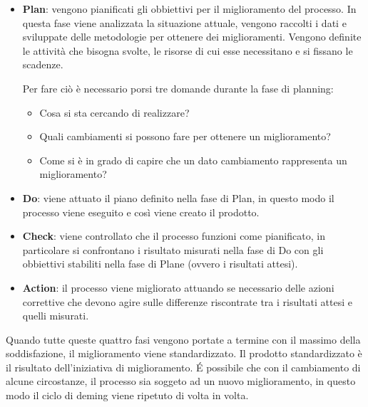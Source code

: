 \begin{itemize}
	\item \textbf{Plan}: vengono pianificati gli obbiettivi per il miglioramento del processo. In questa fase viene analizzata la situazione attuale, vengono raccolti i dati e sviluppate delle metodologie per ottenere dei miglioramenti. Vengono definite le attività che bisogna svolte, le risorse di cui esse necessitano e si fissano le scadenze.
	
	Per fare ciò è necessario porsi tre domande durante la fase di planning:
	\begin{itemize}
		\item Cosa si sta cercando di realizzare?
		\item Quali cambiamenti si possono fare per ottenere un miglioramento?
		\item Come si è in grado di capire che un dato cambiamento rappresenta un miglioramento?
	\end{itemize}

	\item \textbf{Do}: viene attuato il piano definito nella fase di Plan, in questo modo il processo viene eseguito e così viene creato il prodotto.
	
	\item \textbf{Check}: viene controllato che il processo funzioni come pianificato, in particolare si confrontano i risultato misurati nella fase di Do con gli obbiettivi stabiliti nella fase di Plane (ovvero i risultati attesi).
	
	\item \textbf{Action}: il processo viene migliorato attuando se necessario delle azioni correttive che devono agire sulle differenze riscontrate tra i risultati attesi e quelli misurati.
\end{itemize}

Quando tutte queste quattro fasi vengono portate a termine con il massimo della soddisfazione, il miglioramento viene standardizzato. Il prodotto standardizzato è il risultato dell'iniziativa di miglioramento. É possibile che con il cambiamento di alcune circostanze, il processo sia soggeto ad un nuovo miglioramento, in questo modo il ciclo di deming viene ripetuto di volta in volta.
